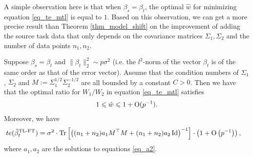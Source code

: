 
A simple observation here is that when $\beta_s = \beta_t$, the optimal $\hat{w}$ for minimizing equation \eqref{eq_te_mtl} is equal to $1$.
Based on this observation, we can get a more precise result than Theorem \ref{thm_model_shift} on the improvement of adding the source task data that only depends on the covariance matrices $\Sigma_1, \Sigma_2$ and the number of data points $n_1, n_2$. 



\begin{proposition}\label{thm_cov_shift}
Suppose $\beta_s = \beta_t$ and $\|\beta_t\|_2^2\sim p\sigma^2$ (i.e. the $l^2$-norm of the vector $\beta_t$ is of the same order as that of the error vector). Assume that the condition numbers of $\Sigma_1$, $\Sigma_2$ and $M:=\Sigma_1^{1/2}\Sigma_2^{-1/2}$ are all bounded by a constant $C>0$. Then we have that the optimal ratio for $W_1/W_2$ in equation \eqref{eq_te_mtl} satisfies
	$$1\leqslant \hat{w} \leqslant 1+\operatorname{O}(p^{-1}).$$%
Moreover, we have
	\begin{align}\label{tehatw1}
		te(\hat{\beta}^{\text{TL-FT}}_{t}) &= \sigma^2 \cdot \operatorname{Tr}\left[\left({(n_1 + n_2)a_1 M^\top M  + (n_1 + n_2)a_2\operatorname{Id}}\right)^{-1}\right] \cdot \left(1+ \operatorname{O}\left(p^{-1}\right)\right),
	\end{align}
where $a_1, a_2$ are the solutions to equations \eqref{eq_a2}. %
\end{proposition}


